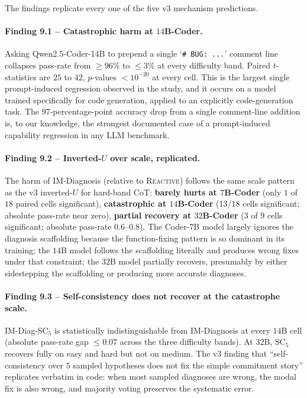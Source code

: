\documentclass[11pt]{article}
\newcommand{\reactive}{\textsc{Reactive}}
\begin{document}
The findings replicate every one of the five v3 mechanism predictions.

\paragraph{Finding 9.1 -- Catastrophic harm at $14$B-Coder.}
Asking Qwen2.5-Coder-14B to prepend a single
`\texttt{\# BUG: ...}' comment line collapses pass-rate from
$\geq 96\%$ to $\leq 3\%$ at every difficulty band.  Paired
$t$-statistics are $25$ to $42$, $p$-values $< 10^{-20}$ at every
cell.  This is the largest single prompt-induced regression
observed in the study, and it occurs on a model trained
specifically for code generation, applied to an explicitly
code-generation task.  The $97$-percentage-point accuracy drop
from a single comment-line addition is, to our knowledge, the
strongest documented case of a prompt-induced capability
regression in any LLM benchmark.

\paragraph{Finding 9.2 -- Inverted-$U$ over scale, replicated.}
The harm of IM-Diagnosis (relative to \reactive) follows the
same scale pattern as the v3 inverted-$U$ for hard-band CoT:
\textbf{barely hurts at $7$B-Coder} (only $1$ of $18$ paired
cells significant), \textbf{catastrophic at $14$B-Coder}
(13/18 cells significant; absolute pass-rate near zero),
\textbf{partial recovery at $32$B-Coder} ($3$ of $9$ cells
significant; absolute pass-rate $0.6$--$0.8$).  The
Coder-7B model largely ignores the diagnosis scaffolding because
the function-fixing pattern is so dominant in its training; the
$14$B model follows the scaffolding literally and produces
wrong fixes under that constraint; the $32$B model partially
recovers, presumably by either sidestepping the scaffolding or
producing more accurate diagnoses.

\paragraph{Finding 9.3 -- Self-consistency does not recover at
the catastrophe scale.}  IM-Diag-SC$_5$ is statistically
indistinguishable from IM-Diagnosis at every $14$B cell
(absolute pass-rate gap $\leq 0.07$ across the three difficulty
bands).  At $32$B, SC$_5$ recovers fully on easy and hard but
not on medium.  The v3 finding that ``self-consistency over
$5$ sampled hypotheses does not fix the simple commitment
story'' replicates verbatim in code: when most sampled
diagnoses are wrong, the modal fix is also wrong, and majority
voting preserves the systematic error.
\end{document}

